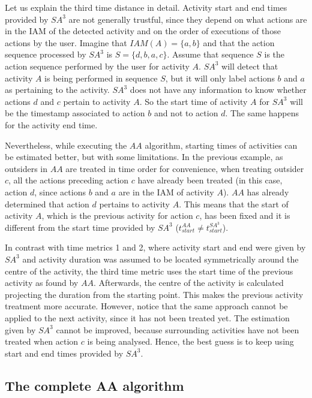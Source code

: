 Let us explain the third time distance in detail. Activity start and end times provided by $SA^3$ are not generally trustful, since they depend on what actions are in the IAM of the detected activity and on the order of executions of those actions by the user. Imagine that $IAM(A)=\{a, b\}$ and that the action sequence processed by $SA^3$ is $S=\{d, b, a, c\}$. Assume that sequence $S$ is the action sequence performed by the user for activity $A$. $SA^3$ will detect that activity $A$ is being performed in sequence $S$, but it will only label actions $b$ and $a$ as pertaining to the activity. $SA^3$ does not have any information to know whether actions $d$ and $c$ pertain to activity $A$. So the start time of activity $A$ for $SA^3$ will be the timestamp associated to action $b$ and not to action $d$. The same happens for the activity end time.

Nevertheless, while executing the $AA$ algorithm, starting times of activities can be estimated better, but with some limitations. In the previous example, as outsiders in $AA$ are treated in time order for convenience, when treating outsider $c$, all the actions preceding action $c$ have already been treated (in this case, action $d$, since actions $b$ and $a$ are in the IAM of activity $A$). $AA$ has already determined that action $d$ pertains to activity $A$. This means that the start of activity $A$, which is the previous activity for action $c$, has been fixed and it is different from the start time provided by $SA^3$ ($t_{start} ^{AA} \neq t_{start} ^{SA^3}$).

In contrast with time metrics 1 and 2, where activity start and end were given by $SA^3$ and activity duration was assumed to be located symmetrically around the centre of the activity, the third time metric uses the start time of the previous activity as found by $AA$. Afterwards, the centre of the activity is calculated projecting the duration from the starting point. This makes the previous activity treatment more accurate. However, notice that the same approach cannot be applied to the next activity, since it has not been treated yet. The estimation given by $SA^3$ cannot be improved, because surrounding activities have not been treated when action $c$ is being analysed. Hence, the best guess is to keep using start and end times provided by $SA^3$.

\subsection{The complete AA algorithm}
\label{subsec:clustering:complete-ac}

